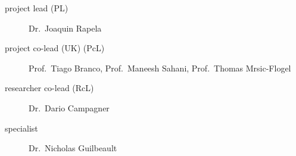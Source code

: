
\begin{description}
    \item[project lead (PL)] Dr.~Joaquin Rapela
    \item[project co-lead (UK) (PcL)] Prof.~Tiago Branco, Prof.~Maneesh Sahani, Prof.~Thomas Mrsic-Flogel
    \item[researcher co-lead (RcL)] Dr.~Dario Campagner
    \item[specialist] Dr.~Nicholas Guilbeault
\end{description}
